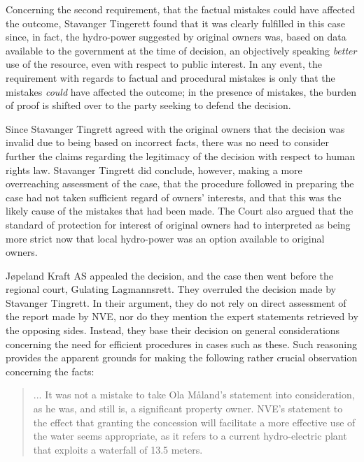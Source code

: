 Concerning the second requirement, that the factual mistakes could have affected the outcome, Stavanger Tingerett found that it was clearly fulfilled in this case since, in fact, the hydro-power suggested by original owners was, based on data available to the government at the time of decision, an objectively speaking \emph{better} use of the resource, even with respect to public interest. In any event, the requirement with regards to factual and procedural mistakes is only that the mistakes \emph{could} have affected the outcome; in the presence of mistakes, the burden of proof is shifted over to the party seeking to defend the decision.

Since Stavanger Tingrett agreed with the original owners that the decision was invalid due to being based on incorrect facts, there was no need to consider further the claims regarding the legitimacy of the decision with respect to human rights law. Stavanger Tingrett did conclude, however, making a more overreaching assessment of the case, that the procedure followed in preparing the case had not taken sufficient regard of owners' interests, and that this was the likely cause of the mistakes that had been made. The Court also argued that the standard of protection for interest of original owners had to interpreted as being more strict now that local hydro-power was an option available to original owners. 


Jøpeland Kraft AS appealed the decision, and the case then went before the regional court, Gulating Lagmannsrett. They overruled the decision made by Stavanger Tingrett. In their argument, they do not rely on direct assessment of the report made by NVE, nor do they mention the expert statements retrieved by the opposing sides. Instead, they base their decision on general considerations concerning the need for efficient procedures in cases such as these. Such reasoning provides the apparent grounds for making the following rather crucial observation concerning the facts:

\begin{quote}... It was not a mistake to take Ola Måland's statement into consideration, as he was, and still is, a significant property owner. NVE's statement to the effect that granting the concession will facilitate 
a more effective use of the water seems appropriate, as it refers to a current hydro-electric plant that 
exploits a waterfall of 13.5 meters.
\end{quote}

